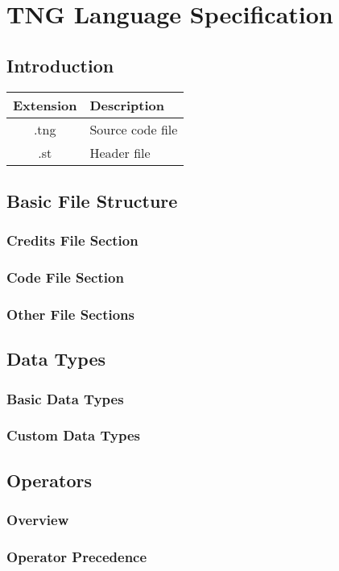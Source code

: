 \documentclass{book}
\begin{document}
\chapter{TNG Language Specification}
\section{Introduction}
\begin{tabular}{|c|l|}
  \hline
  \textbf{Extension} & \textbf{Description} \\
  \hline
  .tng & Source code file \\
  .st  & Header file \\
  \hline
\end{tabular}
\section{Basic File Structure}
\subsection{Credits File Section}
\subsection{Code File Section}
\subsection{Other File Sections}
\section{Data Types}
\subsection{Basic Data Types}
\subsection{Custom Data Types}
\section{Operators}

\subsection{Overview}
\subsection{Operator Precedence}
\end{document}
